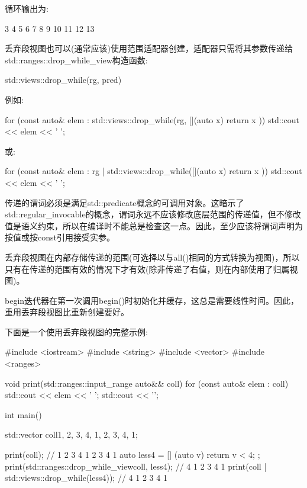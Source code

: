 循环输出为:

\begin{shell}
3 4 5 6 7 8 9 10 11 12 13
\end{shell}


丢弃段视图也可以(通常应该)使用范围适配器创建，适配器只需将其参数传递给std::ranges::drop\_while\_view构造函数:

\begin{cpp}
std::views::drop_while(rg, pred)
\end{cpp}

例如:

\begin{cpp}
for (const auto& elem : std::views::drop_while(rg, [](auto x) {
						return x %
					})) {
	std::cout << elem << ' ';
}
\end{cpp}

或:

\begin{cpp}
for (const auto& elem : rg | std::views::drop_while([](auto x) {
						return x %
					})) {
	std::cout << elem << ' ';
}
\end{cpp}

传递的谓词必须是满足std::predicate概念的可调用对象。这暗示了std::regular\_invocable的概念，谓词永远不应该修改底层范围的传递值，但不修改值是语义约束，所以在编译时不能总是检查这一点。因此，至少应该将谓词声明为按值或按const引用接受实参。

丢弃段视图在内部存储传递的范围(可选择以与all()相同的方式转换为视图)，所以只有在传递的范围有效的情况下才有效(除非传递了右值，则在内部使用了归属视图)。

begin迭代器在第一次调用begin()时初始化并缓存，这总是需要线性时间。因此，重用丢弃段视图比重新创建要好。

下面是一个使用丢弃段视图的完整示例:


\begin{cpp}
#include <iostream>
#include <string>
#include <vector>
#include <ranges>

void print(std::ranges::input_range auto&& coll)
{
	for (const auto& elem : coll) {
		std::cout << elem << ' ';
	}
	std::cout << '\n';
}

int main()
{
	std::vector coll{1, 2, 3, 4, 1, 2, 3, 4, 1};
	
	print(coll); // 1 2 3 4 1 2 3 4 1
	auto less4 = [] (auto v) { return v < 4; };
	print(std::ranges::drop_while_view{coll, less4}); // 4 1 2 3 4 1
	print(coll | std::views::drop_while(less4)); // 4 1 2 3 4 1
}
\end{cpp}

